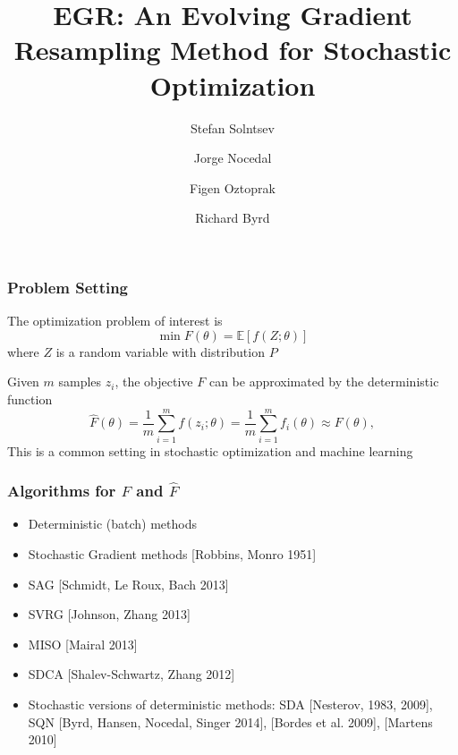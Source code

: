\documentclass{beamer}
\begin{document}
\title[EGR]{EGR: An Evolving Gradient Resampling Method for Stochastic Optimization}
\author[Solntsev, Stefan] %
{Stefan Solntsev \and Jorge Nocedal \and Figen Oztoprak \and Richard Byrd}

\begin{frame}
	\titlepage
\end{frame}

\begin{frame}
	\frametitle{Problem Setting}
	\begin{block}{}
	The optimization problem of interest is
	\begin{equation*}
		\label{prob}
		\min F(\theta) = \mathbb{E}[ f(Z;\theta)]
	\end{equation*}
	where $Z$ is a random variable with distribution $P$
	\end{block}
	
	\pause
	
	\begin{block}{}
	Given $m$ samples $z_i$, the objective $F$ can be approximated by the deterministic function
	\begin{equation*}
		\label{saa}
 		\hat{F}(\theta) = \frac{1}{m} \sum_{i=1}^{m}  f(z_i;\theta)  =\frac{1}{m} \sum_{i=1}^{m}  f_i(\theta)\approx F(\theta),
	\end{equation*}
	This is a common setting in stochastic optimization and machine learning
	\end{block}
\end{frame}	 

		\begin{frame}
			\frametitle{Algorithms for $F$ and $\hat{F}$}
			\begin{itemize}
	\pause
				\item Deterministic (batch) methods
	\pause
				\item Stochastic Gradient methods [Robbins, Monro 1951]
	\pause 
				\item SAG [Schmidt, Le Roux, Bach 2013]
	\pause
				\item SVRG [Johnson, Zhang 2013]
	\pause
				\item MISO [Mairal 2013]
	\pause
				\item SDCA [Shalev-Schwartz, Zhang 2012]
	\pause
				\item Stochastic versions of deterministic methods: SDA [Nesterov, 1983, 2009], SQN [Byrd, Hansen, Nocedal, Singer 2014], [Bordes
et al. 2009], [Martens 2010]
			\end{itemize}
			\end{frame}
			
\end{document}

